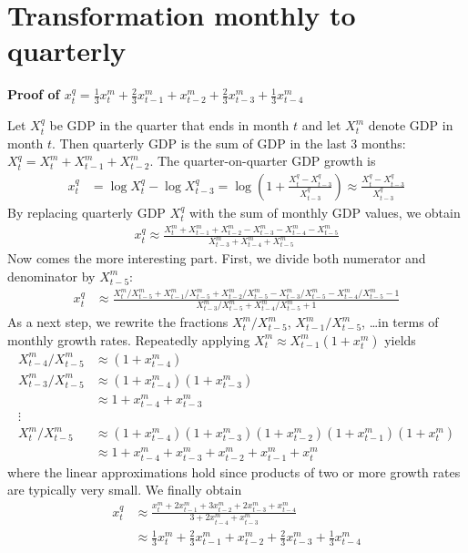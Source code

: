 \chapter{Transformation monthly to quarterly}\label{sec:mariano-murasawa}
	
\textbf{Proof of $x_t^q = \frac{1}{3} x_t^m + \frac{2}{3} x_{t-1}^m + x_{t-2}^m + \frac{2}{3} x_{t-3}^m + \frac{1}{3} x_{t-4}^m$}

Let $X^q_t$ be GDP in the quarter that ends in month $t$ and let $X^m_t$ denote GDP in month $t$. Then quarterly GDP is the sum of GDP in the last 3 months: $X^q_t = X^m_t + X^m_{t-1} + X^m_{t-2}$. The quarter-on-quarter GDP growth is
\begin{align}
x^q_t &= \log X^q_t - \log X^q_{t-3} 
= \log(1 + \frac{X^q_t-X^q_{t-3}}{X^q_{t-3}}) 
\approx \frac{X^q_t-X^q_{t-3}}{X^q_{t-3}}
\end{align}
By replacing quarterly GDP $X^q_t$ with the sum of monthly GDP values, we obtain
\begin{align}
x^q_t \approx \frac{X^m_t + X^m_{t-1} + X^m_{t-2} - X^m_{t-3} - X^m_{t-4} - X^m_{t-5}}{X^m_{t-3} + X^m_{t-4} + X^m_{t-5}}
\end{align}
Now comes the more interesting part. First, we divide both numerator and denominator by $X^m_{t-5}$:
\begin{align}
x^q_t &\approx \frac{X^m_t/X^m_{t-5} + X^m_{t-1}/X^m_{t-5} + X^m_{t-2}/X^m_{t-5} - X^m_{t-3}/X^m_{t-5} - X^m_{t-4}/X^m_{t-5} - 1}{X^m_{t-3}/X^m_{t-5} + X^m_{t-4}/X^m_{t-5} + 1}
\end{align}
As a next step, we rewrite the fractions $X_t^m/X_{t-5}^m$, $X_{t-1}^m/X_{t-5}^m$, \dots in terms of monthly growth rates. Repeatedly applying $X_t^m \approx X_{t-1}^m(1+x_{t}^m)$ yields
\begin{align}
X_{t-4}^m/X_{t-5}^m &\approx (1+x_{t-4}^m) \\
X_{t-3}^m/X_{t-5}^m &\approx (1+x_{t-4}^m)(1+x_{t-3}^m) \\
&\approx 1 + x_{t-4}^m + x_{t-3}^m \\
\vdots &  \\
X_t^m/X_{t-5}^m &\approx (1+x_{t-4}^m)(1+x_{t-3}^m)(1+x_{t-2}^m)(1+x_{t-1}^m)(1+x_t^m) \\
&\approx 1 + x_{t-4}^m + x_{t-3}^m + x_{t-2}^m + x_{t-1}^m + x_t^m
\end{align}
where the linear approximations hold since products of two or more growth rates are typically very small. We finally obtain
\begin{align}
x_t^q &\approx \frac{x_t^m + 2x_{t-1}^m + 3x_{t-2}^m + 2x_{t-3}^m + x_{t-4}^m}{3 + 2 x_{t-4}^m + x_{t-3}^m} \\
&\approx \frac{1}{3} x_t^m + \frac{2}{3} x_{t-1}^m + x_{t-2}^m + \frac{2}{3} x_{t-3}^m + \frac{1}{3} x_{t-4}^m
\end{align}

